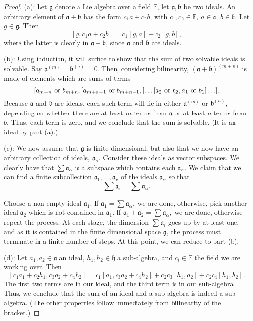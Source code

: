 \documentclass{amsart}
\newcommand*{\g}{\mathfrak{g}}
\begin{document}
\begin{proof}
(a):  Let $\g$ denote a Lie algebra over a field $\mathbb{F}$, let $\mathfrak{a}, \mathfrak{b}$
  be two ideals.   An arbitrary element of
  $\mathfrak{a} + \mathfrak{b}$ has the form $c_{1}a + c_{2}b$, with $c_{1}, c_{2} \in \mathbb{F}$, $a
  \in \mathfrak{a}$, $b \in \mathfrak{b}$.  Let $g \in \g$.  Then 
$$[g, c_{1}a + c_{2}b] = c_{1}[g,a] + c_{2}[g,b],$$
where the latter is clearly in $\mathfrak{a} + \mathfrak{b}$, since
$\mathfrak{a}$ and $\mathfrak{b}$ are ideals.

(b):  Using induction, it will suffice to show that the sum of two
solvable ideals is solvable.  Say $\mathfrak{a}^{(m)} =
\mathfrak{b}^{(n)} = 0$.  Then, considering bilinearity,
$(\mathfrak{a} + \mathfrak{b})^{(m+n)}$ is made of elements which are
sums of terms $$[a_{m+n} \textnormal{ or } b_{m+n}, [a_{m+n-1}
    \textnormal{ or } b_{m+n-1}, [ \ldots [a_{2} \textnormal{ or } b_{2},
	a_{1} \textnormal{ or } b_{1}]\ldots ].$$  Because
    $\mathfrak{a}$ and $\mathfrak{b}$ are ideals, each such term will
    lie in either $\mathfrak{a}^{(m)}$ or $\mathfrak{b}^{(n)}$,
    depending on whether there are at least $m$ terms from
    $\mathfrak{a}$ or at least $n$ terms from $b$.  Thus, each term is
    zero, and we conclude that the sum is solvable.  (It is an ideal
    by part (a).)

(c):  We now assume that $\g$ is finite dimensional, but also that we
    now have an arbitrary collection of ideals,
    $\mathfrak{a}_{\alpha}$.  Consider these ideals as vector
    subspaces.  We clearly have that $\sum \mathfrak{a}_{\alpha}$ is a
    subspace which contains each $\mathfrak{a}_{\alpha}$.  We claim
    that we can find a finite subcollection $\mathfrak{a}_{1}, \ldots,
    \mathfrak{a}_{n}$ of the ideals $\mathfrak{a}_{\alpha}$ so that
    $$\sum \mathfrak{a}_{i} = \sum \mathfrak{a}_{\alpha}.$$

Choose a
    non-empty ideal $\mathfrak{a}_{1}$.  If $\mathfrak{a}_{1} = \sum
    \mathfrak{a}_{\alpha},$ we are done, otherwise, pick another ideal
    $\mathfrak{a}_{2}$ which is not contained in $\mathfrak{a}_{1}$.
    If $\mathfrak{a}_{1} + \mathfrak{a}_{2} = \sum
    \mathfrak{a}_{\alpha},$ we are done, otherwise repeat the
    process.  At each stage, the dimension $\sum \mathfrak{a}_{i}$
    goes up by at least one, and as it is contained in the finite
    dimensional space $\g$, the process must terminate in a finite
    number of steps.  At this point, we can reduce to part (b).

(d):  Let $a_{1}, a_{2} \in \mathfrak{a}$ an ideal, $h_{1}, h_{2} \in
    \mathfrak{h}$ a sub-algebra, and $c_{i} \in \mathbb{F}$ the field we are
    working over.  Then $$[c_{1}a_{1} + c_{2}h_{1}, c_{3}a_{2} +
    c_{4}h_{2}] = c_{1}[a_{1},c_{3}a_{2} + c_{4}h_{2}] +
    c_{2}c_{3}[h_{1}, a_{2}] + c_{2}c_{4}[h_{1},h_{2}].$$  The first
    two terms are in our ideal, and the third term is in our
    sub-algebra.  Thus, we conclude that the sum of an ideal and a
    sub-algebra is indeed a sub-algebra.  (The other properties follow
    immediately from bilinearity of the bracket.)
\end{proof}
\end{document}
